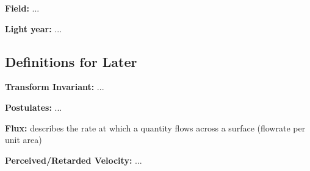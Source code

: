 \linesep

\noindent \hypertarget{def-field}{\textbf{Field:}}
...

\linesep

\noindent \hypertarget{def-light-year}{\textbf{Light year:}}
...

\linesep

\subsection{Definitions for Later}%

\noindent \hypertarget{def-lorentz-invariant}{\textbf{Transform Invariant:}}
...

\linesep

\noindent \hypertarget{def-postulates}{\textbf{Postulates:}}
...

\linesep

\noindent \hypertarget{def-flux}{\textbf{Flux:}}
describes the rate at which a quantity flows across a surface (flowrate per unit area)

\linesep

\noindent \hypertarget{def-retarded-velocity}{\textbf{Perceived/Retarded Velocity:}}
...